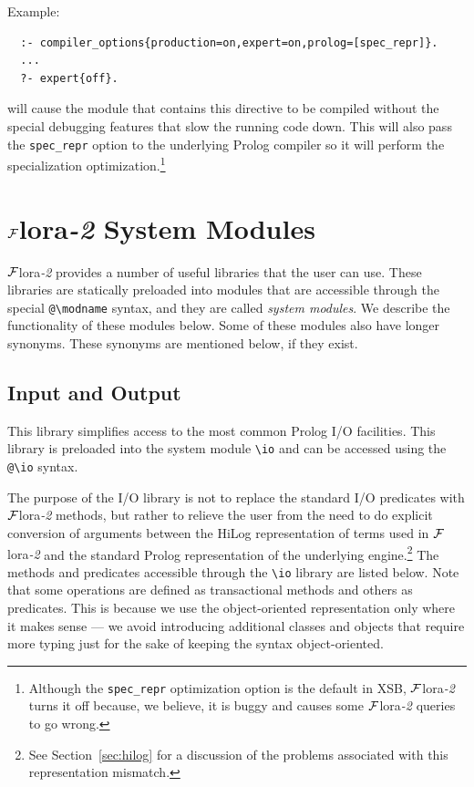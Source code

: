 \documentclass[11pt]{article}
\newcommand{\FLORA}{{\mbox{\sc ${\cal F}${lora}\rm\emph{-2}}}\xspace}
\newcommand{\FLSYSTEM}{\FLORA}
\newcommand{\bs}{\textbackslash}
\begin{document}
Example:
\begin{verbatim}
  :- compiler_options{production=on,expert=on,prolog=[spec_repr]}.
  ...
  ?- expert{off}.
\end{verbatim}
will cause the module that contains this directive to be compiled without
the special debugging features that slow the running code down. This will
also pass the \texttt{spec\_repr} option to the underlying Prolog compiler
so  it will perform the specialization optimization.\footnote{
  Although the \texttt{spec\_repr} optimization option is the default in
  XSB, \FLSYSTEM turns it off because, we believe, it is buggy and causes some
  \FLSYSTEM queries to go wrong.
  }


\section{\FLSYSTEM System Modules}\label{sec-service-libs}

\FLSYSTEM provides a number of useful libraries that the user can use.
These libraries are statically preloaded into modules that are accessible
through the special {\tt @\bs{}modname} syntax, and they are called
\emph{system modules}.  We describe the functionality of these modules
below. Some of these modules also have longer synonyms.
These synonyms are mentioned below, if they exist.

\subsection{Input and Output}

This library simplifies access to the most common Prolog I/O facilities.
This library is preloaded into the system module {\tt \bs{}io} and
can be accessed using the {\tt @\bs{}io} syntax.

The purpose of the I/O library is not to replace the standard I/O predicates
with \FLSYSTEM methods, but rather to relieve the user from the need to do
explicit conversion of arguments between the HiLog representation of terms
used in \FLSYSTEM and the standard Prolog representation of the underlying
engine.\footnote{
  See Section~\ref{sec:hilog} for a discussion of the problems associated
  with this representation mismatch.
  }
The methods and predicates accessible through the {\tt \bs{}io} library are
listed below.  Note that some operations are defined as transactional methods
and others as predicates. This is because we use the object-oriented
representation only where it makes sense --- we avoid introducing
additional classes and objects that require more typing just for the sake
of keeping the syntax object-oriented.
\end{document}
